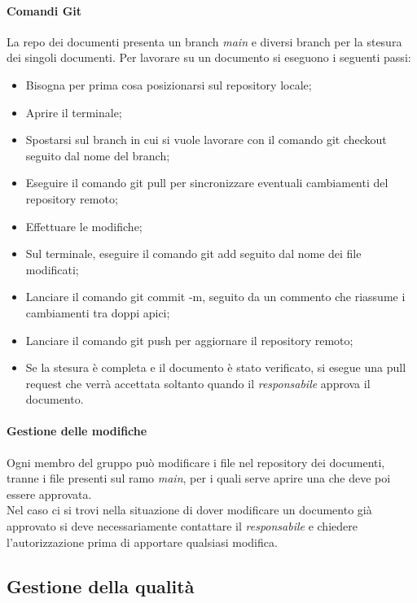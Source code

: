 \paragraph{Comandi Git}
\label{par:comandi_git}
La repo dei documenti presenta un branch \emph{main} e diversi branch per la stesura dei singoli documenti. Per 
lavorare su un documento si eseguono i seguenti passi:
\begin{itemize}
    \item Bisogna per prima cosa posizionarsi sul repository locale;
    \item Aprire il terminale;
    \item Spostarsi sul branch in cui si vuole lavorare con il comando git checkout seguito dal nome del branch;
    \item Eseguire il comando git pull per sincronizzare eventuali cambiamenti del repository remoto;
    \item Effettuare le modifiche;
    \item Sul terminale, eseguire il comando git add seguito dal nome dei file modificati;
    \item Lanciare il comando git commit -m, seguito da un commento che riassume i cambiamenti tra doppi apici;
    \item Lanciare il comando git push per aggiornare il repository remoto;
    \item Se la stesura è completa e il documento è stato verificato, si esegue una pull request che verrà accettata soltanto quando il \emph{responsabile} approva il documento.
\end{itemize}

\paragraph{Gestione delle modifiche}
\label{par:gestione_modifiche}
Ogni membro del gruppo può modificare i file nel repository dei documenti, tranne i file presenti sul ramo \emph{main}, 
per i quali serve aprire una  che deve poi essere approvata.\\
Nel caso ci si trovi nella situazione di dover modificare un documento già approvato si deve necessariamente contattare 
il \emph{responsabile} e chiedere l'autorizzazione prima di apportare qualsiasi modifica.

\subsection{Gestione della qualità}
\label{sub:gestione_qualita}

